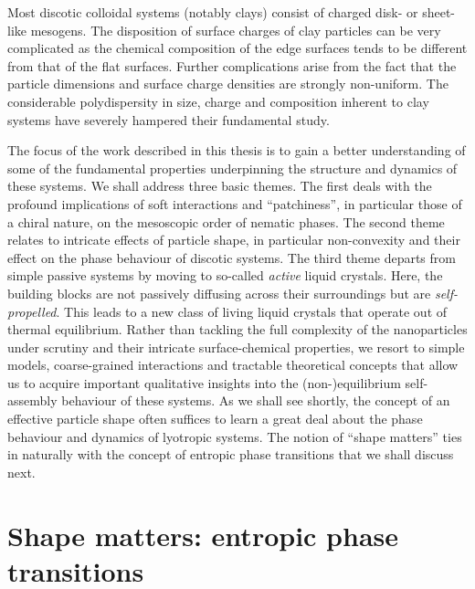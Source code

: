 \documentclass[amssymb]{revtex4}
\begin{document}
Most discotic colloidal systems (notably clays) consist of charged disk- or sheet-like mesogens. The disposition of surface charges of clay particles can be very complicated as the chemical composition of the edge surfaces tends to be different from that of the flat surfaces. Further complications arise from the fact that the particle dimensions and surface charge densities are strongly non-uniform. The considerable polydispersity in size, charge and composition inherent to clay systems have severely hampered their fundamental study. 

The focus of the work described in this thesis is to gain a better understanding of some of the fundamental properties underpinning the structure and dynamics of these systems. We shall address three basic themes. The first deals with the profound implications of soft interactions and ``patchiness'', in particular those of a chiral nature, on the mesoscopic order of nematic phases. 
The second theme relates to intricate effects of particle shape, in particular  non-convexity and their effect on the phase behaviour of discotic systems. 
The third theme departs from simple passive systems by moving to so-called {\em active} liquid crystals.  Here,  the building blocks are not passively diffusing across their surroundings but are {\em self-propelled}. This leads to a new class of living  liquid crystals that operate out of thermal equilibrium.    Rather than tackling  the full complexity of the nanoparticles under scrutiny and their intricate surface-chemical properties, we resort to simple models, coarse-grained interactions and tractable theoretical concepts that allow us to acquire important qualitative insights into the (non-)equilibrium self-assembly behaviour of these systems.  As we shall see shortly, the concept of an effective particle  shape often suffices to learn a great deal about the phase behaviour and dynamics of lyotropic systems.  The notion of ``shape matters'' ties in naturally with the concept of entropic phase transitions that we shall discuss next.

\section{Shape matters: entropic phase transitions}
\end{document}
